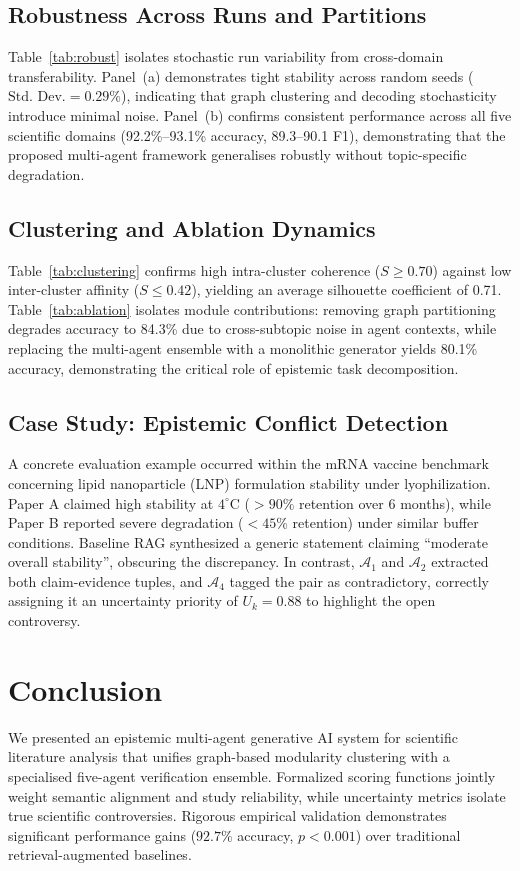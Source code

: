 \documentclass[conference]{IEEEtran}
\begin{document}
\subsection{Robustness Across Runs and Partitions}
Table~\ref{tab:robust} isolates stochastic run variability from cross-domain
transferability. Panel~(a) demonstrates tight stability across random seeds
($\text{Std. Dev.} = 0.29\%$), indicating that graph clustering and decoding
stochasticity introduce minimal noise. Panel~(b) confirms consistent performance
across all five scientific domains (92.2\%--93.1\% accuracy, 89.3--90.1 F1),
demonstrating that the proposed multi-agent framework generalises robustly
without topic-specific degradation.

\subsection{Clustering and Ablation Dynamics}
Table~\ref{tab:clustering} confirms high intra-cluster coherence ($S \geq 0.70$)
against low inter-cluster affinity ($S \leq 0.42$), yielding an average
silhouette coefficient of 0.71. Table~\ref{tab:ablation} isolates module
contributions: removing graph partitioning degrades accuracy to 84.3\% due to
cross-subtopic noise in agent contexts, while replacing the multi-agent
ensemble with a monolithic generator yields 80.1\% accuracy, demonstrating the
critical role of epistemic task decomposition.

\subsection{Case Study: Epistemic Conflict Detection}
A concrete evaluation example occurred within the mRNA vaccine benchmark
concerning lipid nanoparticle (LNP) formulation stability under lyophilization.
Paper A claimed high stability at $4^\circ\mathrm{C}$ ($>90\%$ retention over 6
months), while Paper B reported severe degradation ($<45\%$ retention) under
similar buffer conditions. Baseline RAG synthesized a generic statement claiming
``moderate overall stability'', obscuring the discrepancy. In contrast,
$\mathcal{A}_1$ and $\mathcal{A}_2$ extracted both claim-evidence tuples, and
$\mathcal{A}_4$ tagged the pair as $\mathrm{contradictory}$, correctly assigning
it an uncertainty priority of $U_k = 0.88$ to highlight the open controversy.

\balance
\section{Conclusion}
We presented an epistemic multi-agent generative AI system for scientific
literature analysis that unifies graph-based modularity clustering with a
specialised five-agent verification ensemble. Formalized scoring functions
jointly weight semantic alignment and study reliability, while uncertainty
metrics isolate true scientific controversies. Rigorous empirical validation
demonstrates significant performance gains ($92.7\%$ accuracy, $p < 0.001$)
over traditional retrieval-augmented baselines.
\end{document}
